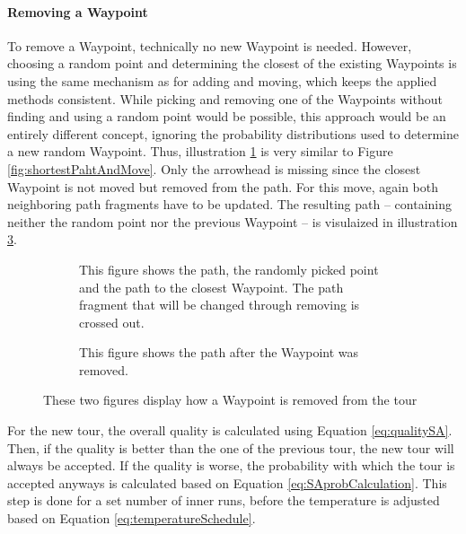 \paragraph{Removing a Waypoint}
To remove a Waypoint, technically no new Waypoint is needed. 
However, choosing a random point and determining the closest of the existing Waypoints is using the same mechanism as for adding and moving, which keeps the applied methods consistent.
While picking and removing one of the Waypoints without finding and using a random point would be possible, this approach would be an entirely different concept, ignoring the probability distributions used to determine a new random Waypoint.
Thus, illustration \ref{fig:shortestPahtAndRemove} is very similar to Figure \ref{fig:shortestPahtAndMove}.
Only the arrowhead is missing since the closest Waypoint is not moved but removed from the path.
For this move, again both neighboring path fragments have to be updated.
The resulting path -- containing neither the random point nor the previous Waypoint -- is visulaized in illustration \ref{fig:shortestPathAndRemoveDone}.

\begin{figure}
	\begin{subfigure}[t]{0.48\textwidth}
		\centering
		
		\caption{This figure shows the path, the randomly picked point and the path to the closest Waypoint.
		The path fragment that will be changed through removing is crossed out.}
		\label{fig:shortestPahtAndRemove}
		\end{subfigure}
		\hfill
		\begin{subfigure}[t]{0.48\textwidth}
		\centering
		
		\caption{This figure shows the path after the Waypoint was removed.}
		\label{fig:shortestPathAndRemoveDone}
		\end{subfigure}
		\caption{These two figures display how a Waypoint is removed from the tour}
	\end{figure}




For the new tour, the overall quality is calculated using Equation \ref{eq:qualitySA}. 
Then, if the quality is better than the one of the previous tour, the new tour will always be accepted.
If the quality is worse, the probability with which the tour is accepted anyways is calculated based on Equation \ref{eq:SAprobCalculation}. 
This step is done for a set number of inner runs, before the temperature is adjusted based on Equation \ref{eq:temperatureSchedule}.




